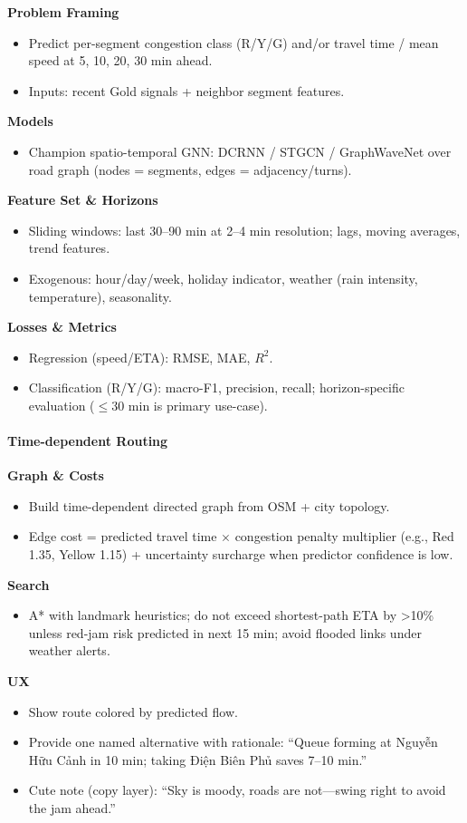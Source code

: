 \textbf{Problem Framing}
\begin{itemize}
  \item Predict per-segment congestion class (R/Y/G) and/or travel time / mean speed at 5, 10, 20, 30 min ahead.
  \item Inputs: recent Gold signals + neighbor segment features.
\end{itemize}
	\textbf{Models}
\begin{itemize}
  \item Champion spatio-temporal GNN: DCRNN / STGCN / GraphWaveNet over road graph (nodes = segments, edges = adjacency/turns).
\end{itemize}
	\textbf{Feature Set \& Horizons}
\begin{itemize}
  \item Sliding windows: last 30--90 min at 2--4 min resolution; lags, moving averages, trend features.
  \item Exogenous: hour/day/week, holiday indicator, weather (rain intensity, temperature), seasonality.
\end{itemize}
	\textbf{Losses \& Metrics}
\begin{itemize}
  \item Regression (speed/ETA): RMSE, MAE, $R^2$.
  \item Classification (R/Y/G): macro-F1, precision, recall; horizon-specific evaluation ($\le 30$ min is primary use-case).
\end{itemize}

\paragraph{Time-dependent Routing}
\mbox{}\newline

	\textbf{Graph \& Costs}
\begin{itemize}
  \item Build time-dependent directed graph from OSM + city topology.
  \item Edge cost = predicted travel time $\times$ congestion penalty multiplier (e.g., Red 1.35, Yellow 1.15) + uncertainty surcharge when predictor confidence is low.
\end{itemize}
	\textbf{Search}
\begin{itemize}
  \item A* with landmark heuristics; do not exceed shortest-path ETA by >10\% unless red-jam risk predicted in next 15 min; avoid flooded links under weather alerts.
\end{itemize}
	\textbf{UX}
\begin{itemize}
  \item Show route colored by predicted flow.
  \item Provide one named alternative with rationale: ``Queue forming at Nguyễn Hữu Cảnh in 10 min; taking Điện Biên Phủ saves 7--10 min.''
  \item Cute note (copy layer): ``Sky is moody, roads are not---swing right to avoid the jam ahead.''
\end{itemize}

